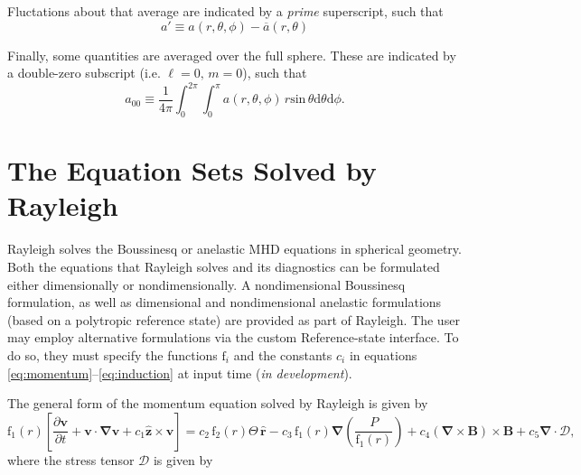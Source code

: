 \documentclass[10pt, letterpaper]{article}
\newcommand{\ff}{\mathrm{f}}
\begin{document}

Fluctations about that average are indicated by a \textit{prime} superscript, such that
\begin{equation}
\label{eq:prime}
a'\equiv a(r,\theta,\phi)-\overline{a}(r,\theta)
\end{equation}

Finally, some quantities are averaged over the full sphere.  These are indicated by a double-zero subscript (i.e. $\ell=0,\,m=0$), such that
\begin{equation}
\label{eq:fullsph}
a_{00}\equiv \frac{1}{4\pi}\int_{0}^{2\pi}\int_{0}^{\pi} a(r,\theta,\phi)\, r\mathrm{sin}\,\theta\mathrm{d}\theta\mathrm{d}\phi.
\end{equation}


\section{The Equation Sets Solved by Rayleigh}
Rayleigh solves the Boussinesq or anelastic MHD equations in spherical geometry.  Both the equations that Rayleigh solves and its diagnostics can be formulated either dimensionally or nondimensionally.  A nondimensional Boussinesq formulation, as well as dimensional and nondimensional anelastic formulations (based on a polytropic reference state) are provided as part of Rayleigh.  The user may employ alternative formulations via the custom Reference-state interface.  To do so, they must specify the functions $\ff_i$ and the constants $c_i$ in equations \ref{eq:momentum}--\ref{eq:induction} at input time (\textit{in development}).   

The general form of the momentum equation solved by Rayleigh is given by
\begin{equation}
\label{eq:momentum}
\ff_1(r)\left[\frac{\partial \boldsymbol{v}}{\partial t} +\boldsymbol{v}\cdot\boldsymbol{\nabla}\boldsymbol{v}  %
                                                         +c_1\boldsymbol{\hat{z}}\times\boldsymbol{v} \right]  = %
                                                         c_2\,\ff_2(r)\Theta\,\boldsymbol{\hat{r}} %
                                                         -c_3\,\ff_1(r)\boldsymbol{\nabla}\left(\frac{P}{\ff_1(r)}\right) %
                                                         +c_4\left(\boldsymbol{\nabla}\times\boldsymbol{B}\right)\times\boldsymbol{B} %
                                                         +c_5\boldsymbol{\nabla}\cdot\boldsymbol{\mathcal{D}},
\end{equation}
where the stress tensor $\mathcal{D}$ is given by
\end{document}
